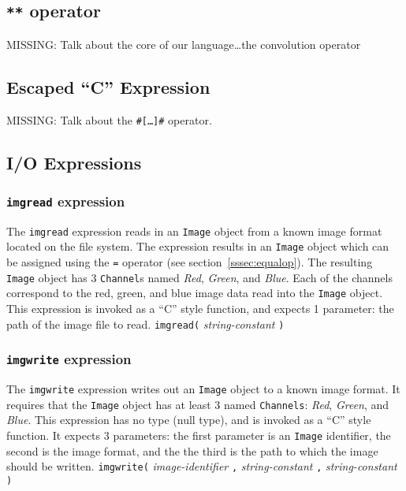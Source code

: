 \subsection{\texttt{**} operator}
\label{ssec:convolutionop}
MISSING: Talk about the core of our language\ldots the convolution operator

\subsection{Escaped ``C'' Expression}
\label{ssec:escapedC}
MISSING: Talk about the \texttt{\#[\ldots]\#} operator.

\subsection{I/O Expressions}

\subsubsection{\texttt{imgread} expression}
\label{sssec:imgread}
The \texttt{imgread} expression reads in an \texttt{Image} object from
a known image format located on the file system. The expression results
in an \texttt{Image} object which can be assigned using the \texttt{=}
operator (see section~\ref{sssec:equalop}). The resulting \texttt{Image}
object has 3 \texttt{Channel}s named \emph{Red}, \emph{Green}, and
\emph{Blue}. Each of the channels correspond to the red, green, and blue
image data read into the \texttt{Image} object. This expression is invoked
as a ``C'' style function, and expects 1 parameter: the path of the image
file to read.
\startsyn
\texttt{imgread(} \emph{string-constant} \texttt{)}
\stopsyn

\subsubsection{\texttt{imgwrite} expression}
\label{sssec:imgwrite}
The \texttt{imgwrite} expression writes out an \texttt{Image} object to a known
image format. It requires that the \texttt{Image} object has at least 3 named
\texttt{Channels}: \emph{Red}, \emph{Green}, and \emph{Blue}.
This expression has no type (null type), and is invoked as a ``C'' style function.
It expects 3 parameters: the first parameter is an \texttt{Image} identifier, the
second is the image format, and the the third is the path to which the image
should be written.
\startsyn
\texttt{imgwrite(} \emph{image-identifier} \texttt{,} \emph{string-constant} \texttt{,} \emph{string-constant} \texttt{)}
\stopsyn

